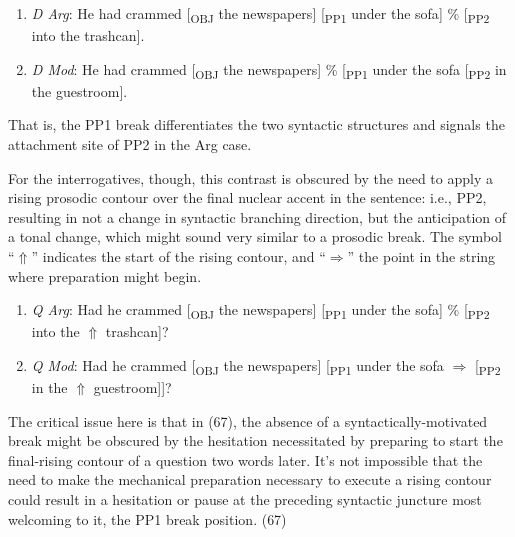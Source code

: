 \documentclass[12pt,oneside]{book}
\providecommand{\tightlist}{%
  \setlength{\itemsep}{0pt}\setlength{\parskip}{0pt}}
\begin{document}
\begin{enumerate}
\def\labelenumi{(\arabic{enumi})}
\setcounter{enumi}{63}
\tightlist
\item
  \emph{D Arg}: He had crammed {[}\textsubscript{OBJ} the newspapers{]} {[}\textsubscript{PP1} under the sofa{]} \% {[}\textsubscript{PP2} into the trashcan{]}.
\item
  \emph{D Mod}: He had crammed {[}\textsubscript{OBJ} the newspapers{]} \% {[}\textsubscript{PP1} under the sofa {[}\textsubscript{PP2} in the guestroom{]}.
\end{enumerate}

 That is, the PP1 break differentiates the two syntactic structures and signals the attachment site of PP2 in the Arg case.

For the interrogatives, though, this contrast is obscured by the need to apply a rising prosodic contour over the final nuclear accent in the sentence: i.e., PP2, resulting in not a change in syntactic branching direction, but the anticipation of a tonal change, which might sound very similar to a prosodic break. The symbol ``\(\Uparrow\)'' indicates the start of the rising contour, and ``\(\Rightarrow\)'' the point in the string where preparation might begin.

\begin{enumerate}
\def\labelenumi{(\arabic{enumi})}
\setcounter{enumi}{65}
\tightlist
\item
  \emph{Q Arg}: Had he crammed {[}\textsubscript{OBJ} the newspapers{]} {[}\textsubscript{PP1} under the sofa{]} \% {[}\textsubscript{PP2} into the \(\Uparrow\) trashcan{]}?
\item
  \emph{Q Mod}: Had he crammed {[}\textsubscript{OBJ} the newspapers{]} {[}\textsubscript{PP1} under the sofa \(\Rightarrow\) {[}\textsubscript{PP2} in the \(\Uparrow\) guestroom{]}{]}?
\end{enumerate}

The critical issue here is that in (67), the absence of a syntactically-motivated break might be obscured by the hesitation necessitated by preparing to start the final-rising contour of a question two words later. It's not impossible that the need to make the mechanical preparation necessary to execute a rising contour could result in a hesitation or pause at the preceding syntactic juncture most welcoming to it, the PP1 break position.  (67) 
\end{document}
